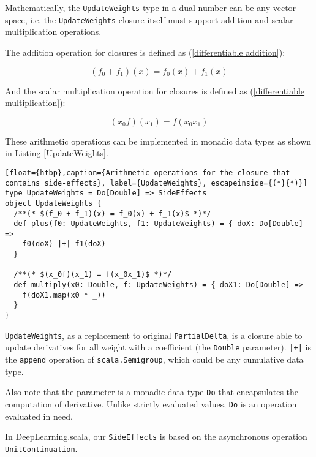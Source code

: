 Mathematically, the \lstinline{UpdateWeights} type in a dual number can be any vector space, i.e. the \lstinline{UpdateWeights} closure itself must support addition and scalar multiplication operations.

The addition operation for closures is defined as (\ref{differentiable addition}):

\begin{equation}
\label{differentiable addition}
(f_0 + f_1)(x) = f_0(x) + f_1(x)
\end{equation}

And the scalar multiplication operation for closures is defined as (\ref{differentiable multiplication}):

\begin{equation}
\label{differentiable multiplication}
(x_0f)(x_1) = f(x_0x_1)
\end{equation}

These arithmetic operations can be implemented in monadic data types as shown in Listing \ref{UpdateWeights}.

\begin{lstlisting}[float={htbp},caption={Arithmetic operations for the closure that contains side-effects}, label={UpdateWeights}, escapeinside={(*}{*)}]
type UpdateWeights = Do[Double] => SideEffects
object UpdateWeights {
  /**(* $(f_0 + f_1)(x) = f_0(x) + f_1(x)$ *)*/
  def plus(f0: UpdateWeights, f1: UpdateWeights) = { doX: Do[Double] =>
    f0(doX) |+| f1(doX)
  }

  /**(* $(x_0f)(x_1) = f(x_0x_1)$ *)*/
  def multiply(x0: Double, f: UpdateWeights) = { doX1: Do[Double] =>
    f(doX1.map(x0 * _))
  }
}
\end{lstlisting}

\lstinline{UpdateWeights}, as a replacement to original \lstinline{PartialDelta}, is a closure able to update derivatives for all weight with a coefficient (the \lstinline{Double} parameter).
\lstinline{|+|} is the \lstinline{append} operation of \lstinline{scala.Semigroup}, which could be any cumulative data type.

Also note that the parameter is a monadic data type \href{https://javadoc.io/page/com.thoughtworks.raii/asynchronous_2.11/latest/com/thoughtworks/raii/asynchronous%24%24Do.html}{\lstinline{Do}} that encapsulates the computation of derivative. Unlike strictly evaluated values, \lstinline{Do} is an operation evaluated in need.

In DeepLearning.scala, our \lstinline{SideEffects} is based on the asynchronous operation \lstinline{UnitContinuation}.

